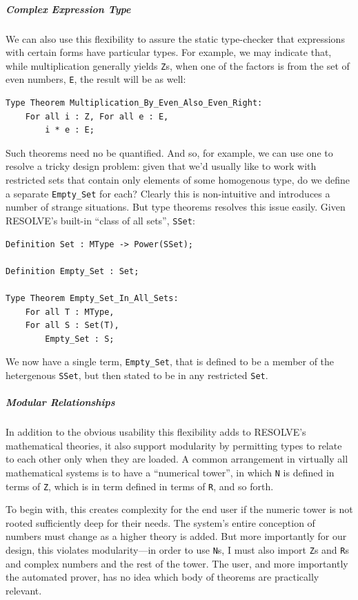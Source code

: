 \subparagraph{Complex Expression Type}
We can also use this flexibility to assure the static type-checker that expressions with certain forms have particular types.  For example, we may indicate that, while multiplication generally yields \texttt{Z}s, when one of the factors is from the set of even numbers, \texttt{E}, the result will be as well:

\begin{lstlisting}
Type Theorem Multiplication_By_Even_Also_Even_Right:
	For all i : Z, For all e : E,
		i * e : E;
\end{lstlisting}

Such theorems need no be quantified.  And so, for example, we can use one to resolve a tricky design problem: given that we'd usually like to work with restricted sets that contain only elements of some homogenous type, do we define a separate \texttt{Empty\_Set} for each?  Clearly this is non-intuitive and introduces a number of strange situations.  But type theorems resolves this issue easily.  Given RESOLVE's built-in ``class of all sets'', \texttt{SSet}:

\begin{lstlisting}
Definition Set : MType -> Power(SSet);

Definition Empty_Set : Set;

Type Theorem Empty_Set_In_All_Sets:
	For all T : MType,
	For all S : Set(T),
		Empty_Set : S; 
\end{lstlisting}

We now have a single term, \texttt{Empty\_Set}, that is defined to be a member of the hetergenous \texttt{SSet}, but then stated to be in any restricted \texttt{Set}.

\subparagraph{Modular Relationships}
In addition to the obvious usability this flexibility adds to RESOLVE's mathematical theories, it also support modularity by permitting types to relate to each other only when they are loaded.  A common arrangement in virtually all mathematical systems is to have a ``numerical tower'', in which \texttt{N} is defined in terms of \texttt{Z}, which is in term defined in terms of \texttt{R}, and so forth.

To begin with, this creates complexity for the end user if the numeric tower is not rooted sufficiently deep for their needs.  The system's entire conception of numbers must change as a higher theory is added.  But more importantly for our design, this violates modularity---in order to use \texttt{N}s, I must also import \texttt{Z}s and \texttt{R}s and complex numbers and the rest of the tower.  The user, and more importantly the automated prover, has no idea which body of theorems are practically relevant.

